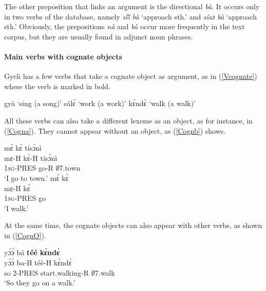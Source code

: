 The other preposition that links an argument is the directional {\itshape bà}. It occurs only in two verbs of the database, namely {\itshape sĩ́ĩ̀ bà} `approach sth.' and {\itshape sísɔ bà} `approach sth.'
Obviously, the prepositions {\itshape nà} and {\itshape bà} occur more frequently in the text corpus, but they are usually found in adjunct noun phrases.

\paragraph{Main verbs with cognate objects}

Gyeli has a few verbs that take a cognate object as argument, as in (\ref{Vcognate}) where the verb is marked in bold.

\begin{exe}
\ex\label{Vcognate}
\begin{xlist}
 gyà `sing (a song)'  
 sálɛ́ `work (a work)'
 kɛ̀ndɛ̀ `walk (a walk)'
\end{xlist}
\end{exe}

All these verbs can also take a different lexeme as an object, as for instance, in (\ref{Cogna}). They cannot appear without an object, as (\ref{Cognb}) shows.

\begin{exe}
\ex\label{Cogn}
\begin{xlist}
\ex \label{Cogna}
   \glll  mɛ́ kɛ́ tísɔ̀nì  \\
          mɛ-H kɛ̀-H tísɔ̀nì \\
         1\textsc{sg}-PRES go-R $\emptyset$7.town    \\
    \trans `I go to town.'
\ex\label{Cognb}
\glll  *mɛ́ kɛ̀ \\
      mɛ-H kɛ̀  \\
       1\textsc{sg}-PRES go    \\
    \trans `I walk.'
 \end{xlist}
\end{exe}

At the same time, the cognate objects can also appear with other verbs, as shown in (\ref{CognO}).

\begin{exe} 
\ex\label{CognO} 
  \glll yɔ́ɔ̀ bá {\bfseries téé} {\bfseries kɛ̀ndɛ̀} \\
        yɔ́ɔ̀ ba-H téè-H kɛ̀ndɛ̀ \\
         so 2-PRES start.walking-R $\emptyset$7.walk   \\
    \trans `So they go on a walk.'
\end{exe}



